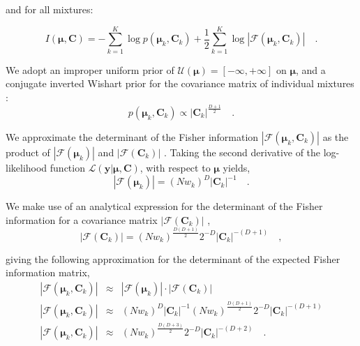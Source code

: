 \documentclass{article}
\newcommand{\vect}[1]{\boldsymbol{\mathbf{#1}}}
\def\veccov{\vect{C}}
\def\vecmean{\vect{\mu}}
\def\weight{w}
\def\datum{y}
\def\data{\vect{\datum}}
\def\likelihood{\mathcal{L}}
\begin{document}
\noindent{}and for all mixtures:

\begin{equation}
  I(\vecmean,\veccov) = -\sum_{k=1}^{K}\log{p(\vecmean_k,\veccov_k)} + \frac{1}{2}\sum_{k=1}^{K}\log{|\mathcal{F}\left(\vecmean_k,\veccov_k\right)|} \quad .
  \label{eq:I_component_params}
\end{equation}

We adopt an improper uniform prior of $\mathcal{U}(\vecmean) = [-\infty, +\infty]$ 
on $\vecmean$, and a conjugate inverted Wishart prior for the covariance matrix
of individual mixtures \citep[e.g., Section 5.2.3. of ][]{Schafer_1997}:
\begin{equation}
  p(\vecmean_k, \veccov_k) \propto |\veccov_k|^{\frac{D+1}{2}} \quad .
  \label{eq:covariance-prior}
\end{equation}

We approximate the determinant of the Fisher information 
$|\mathcal{F}(\vecmean_k, \veccov_k)|$ as the product of 
$|\mathcal{F}\left(\vecmean_k\right)|$ and $|\mathcal{F}\left(\veccov_k\right)|$ 
\citep{Oliver_1996,Roberts_1998}.  Taking the second derivative of the
log-likelihood function $\likelihood\left(\data|\vecmean,\veccov\right)$,
with respect to $\vecmean$ yields,
\begin{equation}
  |\mathcal{F}\left(\vecmean_k\right)| = (N\weight_k)^{D}|\veccov_k|^{-1} \quad .
\end{equation}

We make use of an analytical expression for the determinant of the Fisher
information for a covariance matrix $|\mathcal{F}(\veccov_k)|$ \citep{Dwyer_1967,Magnus_1988,Kasarapu_2015},
\begin{equation}
  |\mathcal{F}\left(\veccov_k\right)| = (N\weight_k)^\frac{D(D+1)}{2}2^{-D}|\veccov_k|^{-(D+1)} \quad ,
\end{equation}

\noindent{}giving the following approximation for the determinant of the
expected Fisher information matrix,
\begin{eqnarray}
  |\mathcal{F}(\vecmean_k,\veccov_k)| & \approx & |\mathcal{F}(\vecmean_k)|\cdot|\mathcal{F}(\veccov_k)| \nonumber \\
  |\mathcal{F}(\vecmean_k,\veccov_k)| & \approx & (N\weight_k)^{D}|\veccov_k|^{-1}(N\weight_k)^\frac{D(D+1)}{2}2^{-D}|\veccov_k|^{-(D+1)} \nonumber \\
  |\mathcal{F}(\vecmean_k,\veccov_k)| & \approx & (N\weight_k)^\frac{D(D+3)}{2}2^{-D}|\veccov_k|^{-(D+2)} \quad .
\end{eqnarray}
\end{document}
